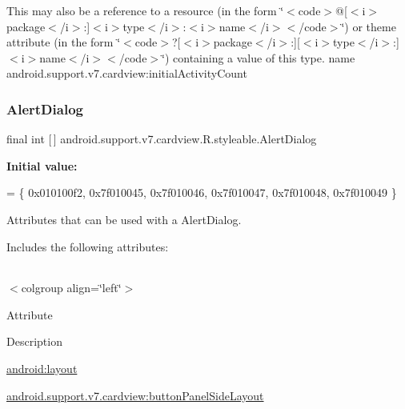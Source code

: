 This may also be a reference to a resource (in the form \char`\"{}$<$code$>$@\mbox{[}$<$i$>$package$<$/i$>$\+:\mbox{]}$<$i$>$type$<$/i$>$\+:$<$i$>$name$<$/i$>$$<$/code$>$\char`\"{}) or theme attribute (in the form \char`\"{}$<$code$>$?\mbox{[}$<$i$>$package$<$/i$>$\+:\mbox{]}\mbox{[}$<$i$>$type$<$/i$>$\+:\mbox{]}$<$i$>$name$<$/i$>$$<$/code$>$\char`\"{}) containing a value of this type.  name android.\+support.\+v7.\+cardview\+:initial\+Activity\+Count \mbox{\label{classandroid_1_1support_1_1v7_1_1cardview_1_1R_1_1styleable_a44fc620801e3af4c8b4e7ef1fee84a2d}} 
\subsubsection{\texorpdfstring{Alert\+Dialog}{AlertDialog}}
{\footnotesize\ttfamily final int \mbox{[}$\,$\mbox{]} android.\+support.\+v7.\+cardview.\+R.\+styleable.\+Alert\+Dialog\hspace{0.3cm}{\ttfamily [static]}}

{\bfseries Initial value\+:}
\begin{DoxyCode}
= \{
            0x010100f2, 0x7f010045, 0x7f010046, 0x7f010047,
            0x7f010048, 0x7f010049
        \}
\end{DoxyCode}
Attributes that can be used with a Alert\+Dialog. 

Includes the following attributes\+:

\tabulinesep=1mm
\begin{longtabu} spread 0pt [c]{*{0}{|X[-1]}|}
\hline
\end{longtabu}
$<$colgroup align=\char`\"{}left\char`\"{}$>$ 

Attribute

Description 

{\ttfamily \hyperlink{classandroid_1_1support_1_1v7_1_1cardview_1_1R_1_1styleable_a46ba2383ccdc3162ba8188ffa37a1070}{android\+:layout}}

{\ttfamily \hyperlink{classandroid_1_1support_1_1v7_1_1cardview_1_1R_1_1styleable_a4ec06892d36ab96c77fe88a60ac4ad6d}{android.\+support.\+v7.\+cardview\+:button\+Panel\+Side\+Layout}}

